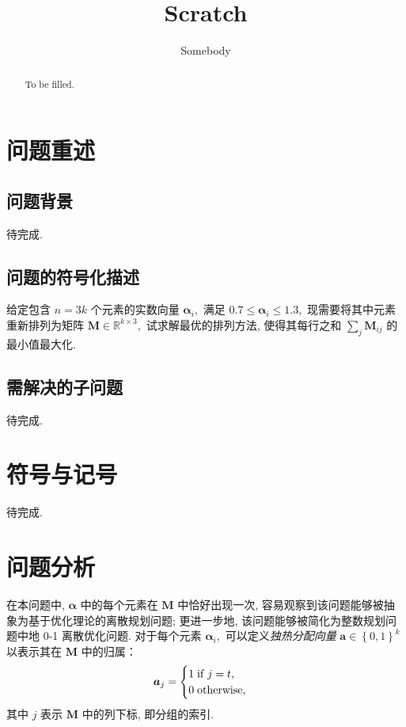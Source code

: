 \documentclass[]{ctexart}
\title{Scratch}
\author{Somebody}
\begin{document}
\maketitle

\begin{abstract}

    To be filled.

\end{abstract}

\section{问题重述}

\subsection{问题背景}

待完成.

\subsection{问题的符号化描述}

给定包含 $n = 3k$ 个元素的实数向量 $\bm{\alpha}_i,$ 满足 $0.7 \le \bm{\alpha}_i \le 1.3,$ 现需要将其中元素重新排列为矩阵 $\bm{M} \in \mathbb{R}^{k \times 3},$ 试求解最优的排列方法, 使得其每行之和 $\sum_{j} \bm{M}_{ij}$ 的最小值最大化.

\subsection{需解决的子问题}

待完成.

\section{符号与记号}

待完成.

\section{问题分析}

在本问题中, $\bm{\alpha}$ 中的每个元素在 $\bm{M}$ 中恰好出现一次, 容易观察到该问题能够被抽象为基于优化理论的离散规划问题; 更进一步地, 该问题能够被简化为整数规划问题中地 0-1 离散优化问题. 对于每个元素 $\bm{\alpha}_i, $ 可以定义\textit{独热分配向量} $\bm{a} \in \left\{0,1\right\}^{k}$ 以表示其在 $\bm{M}$ 中的归属：
\begin{equation}
   \bm{a}_j = \begin{cases}
       1 \thickspace \text{if}\ j = t,\\
       0 \thickspace \text{otherwise},\\
   \end{cases}
\end{equation}
其中 $j$ 表示 $\bm{M}$ 中的列下标, 即分组的索引.
\end{document}
